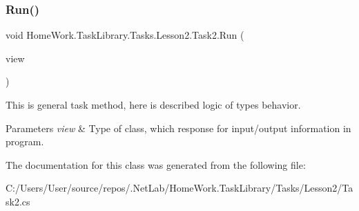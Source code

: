 \subsubsection{\texorpdfstring{Run()}{Run()}}
{\footnotesize\ttfamily void Home\+Work.\+Task\+Library.\+Tasks.\+Lesson2.\+Task2.\+Run (\begin{DoxyParamCaption}\item[{I\+Information}]{view }\end{DoxyParamCaption})}



This is general task method, here is described logic of types behavior. 


\begin{DoxyParams}{Parameters}
{\em view} & Type of class, which response for input/output information in program.\\
\hline
\end{DoxyParams}


The documentation for this class was generated from the following file\+:\begin{DoxyCompactItemize}
\item 
C\+:/\+Users/\+User/source/repos/.\+Net\+Lab/\+Home\+Work.\+Task\+Library/\+Tasks/\+Lesson2/Task2.\+cs\end{DoxyCompactItemize}
